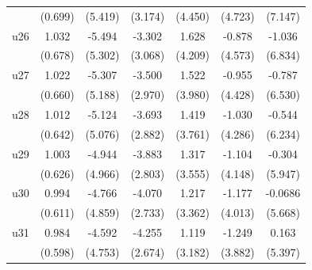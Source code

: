 \begin{table}[htbp]
\begin{tabular}{l*{6}{c}}
                    &     (0.699)         &     (5.419)         &     (3.174)         &     (4.450)         &     (4.723)         &     (7.147)         \\
\addlinespace
u26                 &       1.032         &      -5.494         &      -3.302         &       1.628         &      -0.878         &      -1.036         \\
                    &     (0.678)         &     (5.302)         &     (3.068)         &     (4.209)         &     (4.573)         &     (6.834)         \\
\addlinespace
u27                 &       1.022         &      -5.307         &      -3.500         &       1.522         &      -0.955         &      -0.787         \\
                    &     (0.660)         &     (5.188)         &     (2.970)         &     (3.980)         &     (4.428)         &     (6.530)         \\
\addlinespace
u28                 &       1.012         &      -5.124         &      -3.693         &       1.419         &      -1.030         &      -0.544         \\
                    &     (0.642)         &     (5.076)         &     (2.882)         &     (3.761)         &     (4.286)         &     (6.234)         \\
\addlinespace
u29                 &       1.003         &      -4.944         &      -3.883         &       1.317         &      -1.104         &      -0.304         \\
                    &     (0.626)         &     (4.966)         &     (2.803)         &     (3.555)         &     (4.148)         &     (5.947)         \\
\addlinespace
u30                 &       0.994         &      -4.766         &      -4.070         &       1.217         &      -1.177         &     -0.0686         \\
                    &     (0.611)         &     (4.859)         &     (2.733)         &     (3.362)         &     (4.013)         &     (5.668)         \\
\addlinespace
u31                 &       0.984\sym{*}  &      -4.592         &      -4.255         &       1.119         &      -1.249         &       0.163         \\
                    &     (0.598)         &     (4.753)         &     (2.674)         &     (3.182)         &     (3.882)         &     (5.397)         \\

\end{tabular}
\end{table}

